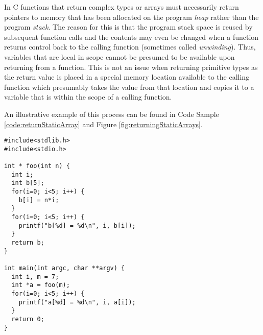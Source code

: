 \documentclass{article}
\begin{document}
In C functions that return complex types or arrays must necessarily return pointers
to memory that has been allocated on the program \emph{heap} rather than the
program \emph{stack}.  The reason for this is that the program stack space is reused
by subsequent function calls and the contents may even be changed when a
function returns control back to the calling function (sometimes called \emph{unwinding}).  
Thus, variables that are local in scope cannot be presumed to be available 
upon returning from a function.  This is not an issue when returning primitive types as 
the return value is placed in a special memory location available to the calling function
which presumably takes the value from that location and copies it to a variable that is
within the scope of a calling function.

An illustrative example of this process can be found in Code Sample 
\ref{code:returnStaticArray} and Figure \ref{fig:returningStaticArrays}.


\begin{lstlisting}[caption=Example returning a static array,label=code:returnStaticArray]
#include<stdlib.h>
#include<stdio.h>

int * foo(int n) {
  int i;
  int b[5];
  for(i=0; i<5; i++) {
    b[i] = n*i;
  }
  for(i=0; i<5; i++) {
    printf("b[%d] = %d\n", i, b[i]);
  }
  return b;
}

int main(int argc, char **argv) {
  int i, m = 7;
  int *a = foo(m);
  for(i=0; i<5; i++) {
    printf("a[%d] = %d\n", i, a[i]);
  }
  return 0;
}
\end{lstlisting}
\end{document}
